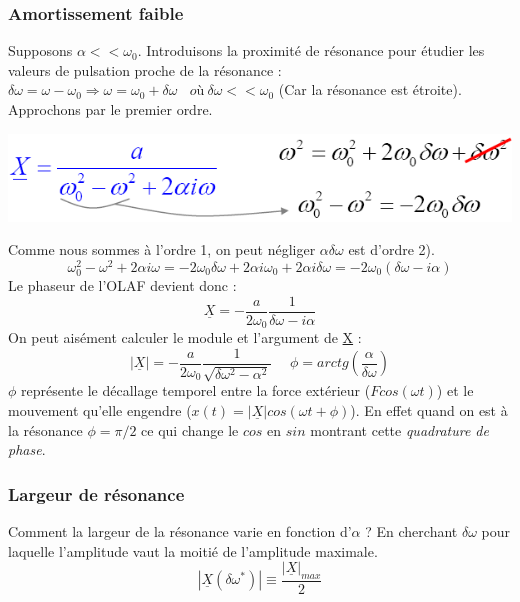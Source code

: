 \documentclass	[11pt, a4paper, openany]{book}
\begin{document}
	\subsubsection{Amortissement faible}
	Supposons $\alpha << \omega_0$. Introduisons la proximité de résonance pour étudier les valeurs de pulsation proche de la résonance : $\delta\omega = \omega - \omega_0 \Rightarrow \omega = \omega_0 + \delta\omega\ \ \ \ où\ \delta\omega << \omega_0$ (Car la résonance est étroite).\\
	Approchons par le premier ordre.
	\begin{center}
		\includegraphics[scale=0.75]{oo/image17.png}
	\end{center}
	Comme nous sommes à l'ordre 1, on peut négliger $\alpha\delta\omega$ est d'ordre 2).
	\begin{equation}
		\omega_0^2 - \omega^2 + 2\alpha i \omega = -2\omega_0\delta\omega + 2\alpha i\omega_0 + 2 \alpha i\delta\omega =  -2\omega_0(\delta\omega - i\alpha)
	\end{equation}
	Le phaseur de l'OLAF devient donc :
	\begin{equation}
		\underline{X} = -\frac{a}{2\omega_0}\frac{1}{\delta\omega - i\alpha}
	\end{equation}
	On peut aisément calculer le module et l'argument de \underline{X} :
	\begin{equation}
		|\underline{X}| = -\frac{a}{2\omega_0}\frac{1}{\sqrt{\delta\omega^2 - \alpha^2}}\ \ \ \ \ \ \phi = arctg\left(\frac{\alpha}{\delta\omega}\right)
	\end{equation}
	$\phi$ représente le décallage temporel entre la force extérieur ($Fcos(\omega t)$) et le mouvement qu'elle engendre ($x(t) = |\underline{X}|cos(\omega t + \phi)$). En effet quand on est à la résonance $\phi = \pi/2$ ce qui change le $cos$ en $sin$ montrant cette \textit{quadrature de phase}.
	
	\subsubsection{Largeur de résonance}
	Comment la largeur de la résonance varie en fonction d'$\alpha$ ? En cherchant $\delta\omega$ pour laquelle l'amplitude vaut la moitié de l'amplitude maximale.
	\begin{equation}
		|\underline{X}(\delta\omega^*)| \equiv \frac{|\underline{X}|_{max}}{2}
	\end{equation}
	
\end{document}
